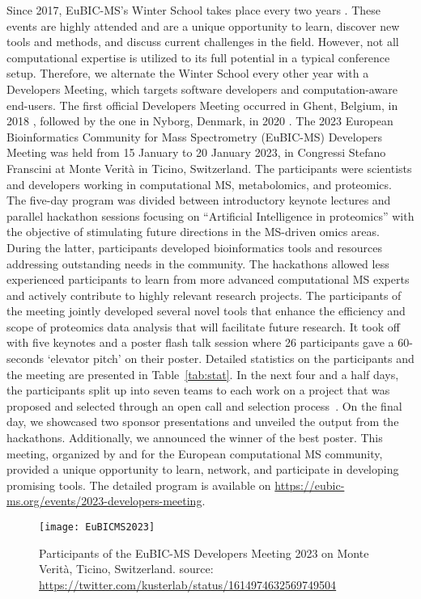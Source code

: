 Since 2017, EuBIC-MS's Winter School takes place every two years \citep{pmid28385664}. These events are highly attended and are a unique opportunity to learn, discover new tools and methods, and discuss current challenges in the field. However, not all computational expertise is utilized to its full potential in a typical conference setup. Therefore, we alternate the Winter School every other year with a Developers Meeting, which targets software developers and computation-aware end-users. The first official Developers Meeting occurred in Ghent, Belgium, in 2018 \citep{pmid29864591}, followed by the one in Nyborg, Denmark, in 2020 \citep{EuBIC-MS2020}.
The 2023 European Bioinformatics Community for Mass Spectrometry (EuBIC-MS) Developers Meeting was held from 15 January to 20 January 2023, in Congressi Stefano Franscini at Monte Verità in Ticino, Switzerland. The participants were scientists and developers working in computational MS, metabolomics, and proteomics. The five-day program was divided between introductory keynote lectures and parallel hackathon sessions focusing on ``Artificial Intelligence in proteomics'' with the objective of stimulating future directions in the MS-driven omics areas. During the latter, participants developed bioinformatics tools and resources addressing outstanding needs in the community. The hackathons allowed less experienced participants to learn from more advanced computational MS experts and actively contribute to highly relevant research projects. The participants of the meeting jointly developed several novel tools that enhance the efficiency and scope of proteomics data analysis that will facilitate future research.
It took off with five keynotes and a poster flash talk session where 26 participants gave a 60-seconds `elevator pitch' on their poster. Detailed statistics on the participants and the meeting are presented in Table~\ref{tab:stat}. In the next four and a half days, the participants split up into seven teams to each work on a project that was proposed and selected through an open call and selection process~\citep{EuBIC2023GitHub}. On the final day, we showcased two sponsor presentations and unveiled the output from the hackathons. Additionally, we announced the winner of the best poster. This meeting, organized by and for the European computational MS community, provided a unique opportunity to learn, network, and participate in developing promising tools. The detailed program is available on \url{https://eubic-ms.org/events/2023-developers-meeting}.

\begin{figure*}[ht]
\centering
\texttt{[image: EuBICMS2023]}
\caption{Participants of the EuBIC-MS Developers Meeting 2023 on Monte Verità, Ticino, Switzerland. source: \url{https://twitter.com/kusterlab/status/1614974632569749504}}
\end{figure*}

